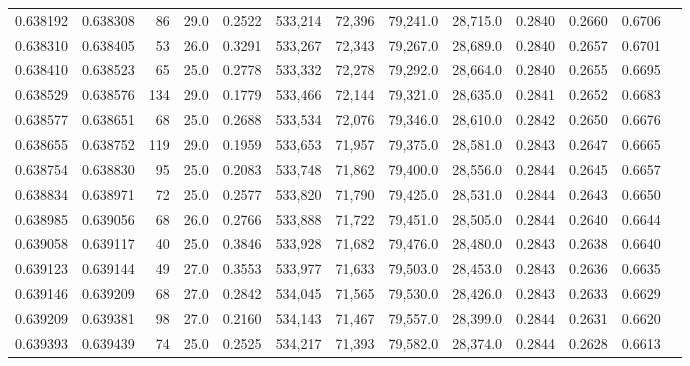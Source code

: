 \begin{tabular}{rrrrrrrrrrrrr}
0.638192 & 0.638308 &    86 & 29.0 &                                     0.2522 & 533,214 &  72,396 &  79,241.0 &  28,715.0 & 0.2840 & 0.2660 & 0.6706 \\
0.638310 & 0.638405 &    53 & 26.0 &                                     0.3291 & 533,267 &  72,343 &  79,267.0 &  28,689.0 & 0.2840 & 0.2657 & 0.6701 \\
0.638410 & 0.638523 &    65 & 25.0 &                                     0.2778 & 533,332 &  72,278 &  79,292.0 &  28,664.0 & 0.2840 & 0.2655 & 0.6695 \\
0.638529 & 0.638576 &   134 & 29.0 &                                     0.1779 & 533,466 &  72,144 &  79,321.0 &  28,635.0 & 0.2841 & 0.2652 & 0.6683 \\
0.638577 & 0.638651 &    68 & 25.0 &                                     0.2688 & 533,534 &  72,076 &  79,346.0 &  28,610.0 & 0.2842 & 0.2650 & 0.6676 \\
0.638655 & 0.638752 &   119 & 29.0 &                                     0.1959 & 533,653 &  71,957 &  79,375.0 &  28,581.0 & 0.2843 & 0.2647 & 0.6665 \\
0.638754 & 0.638830 &    95 & 25.0 &                                     0.2083 & 533,748 &  71,862 &  79,400.0 &  28,556.0 & 0.2844 & 0.2645 & 0.6657 \\
0.638834 & 0.638971 &    72 & 25.0 &                                     0.2577 & 533,820 &  71,790 &  79,425.0 &  28,531.0 & 0.2844 & 0.2643 & 0.6650 \\
0.638985 & 0.639056 &    68 & 26.0 &                                     0.2766 & 533,888 &  71,722 &  79,451.0 &  28,505.0 & 0.2844 & 0.2640 & 0.6644 \\
0.639058 & 0.639117 &    40 & 25.0 &                                     0.3846 & 533,928 &  71,682 &  79,476.0 &  28,480.0 & 0.2843 & 0.2638 & 0.6640 \\
0.639123 & 0.639144 &    49 & 27.0 &                                     0.3553 & 533,977 &  71,633 &  79,503.0 &  28,453.0 & 0.2843 & 0.2636 & 0.6635 \\
0.639146 & 0.639209 &    68 & 27.0 &                                     0.2842 & 534,045 &  71,565 &  79,530.0 &  28,426.0 & 0.2843 & 0.2633 & 0.6629 \\
0.639209 & 0.639381 &    98 & 27.0 &                                     0.2160 & 534,143 &  71,467 &  79,557.0 &  28,399.0 & 0.2844 & 0.2631 & 0.6620 \\
0.639393 & 0.639439 &    74 & 25.0 &                                     0.2525 & 534,217 &  71,393 &  79,582.0 &  28,374.0 & 0.2844 & 0.2628 & 0.6613 \\

\end{tabular}

